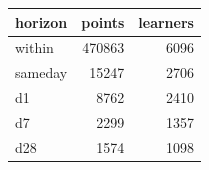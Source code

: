 \begin{tabular}{lrr}
\toprule
horizon & points & learners \\
\midrule
within & 470863 & 6096 \\
sameday & 15247 & 2706 \\
d1 & 8762 & 2410 \\
d7 & 2299 & 1357 \\
d28 & 1574 & 1098 \\
\bottomrule
\end{tabular}
